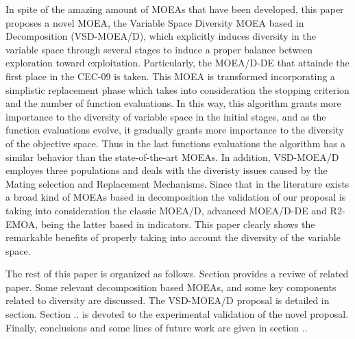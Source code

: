 In spite of the amazing amount of MOEAs that have been developed, this paper proposes a novel MOEA, the Variable Space Diversity MOEA based in Decomposition (VSD-MOEA/D), which explicitly induces diversity in the variable space through several stages to induce a proper balance between exploration toward exploitation.
%
Particularly, the MOEA/D-DE that attainde the first place in the CEC-09 is taken.
%
This MOEA is transformed incorporating a simplistic replacement phase which takes into consideration the stopping criterion and the number of function evaluations.
%
In this way, this algorithm grants more importance to the diversity of variable space in the initial stages, and as the function evaluations evolve, it gradually grants more importance to the diversity of the objective space.
%
Thus in the last functions evaluations the algorithm has a similar behavior than the state-of-the-art MOEAs.
%
In addition, VSD-MOEA/D employes three populations and deals with the diveristy issues caused by the Mating selection and Replacement Mechanisms.
%
Since that in the literature exists a broad kind of MOEAs based in decomposition the validation of our proposal is taking into consideration the classic MOEA/D, advanced MOEA/D-DE and R2-EMOA, being the latter based in indicators.
%
This paper clearly shows the remarkable benefits of properly taking into account the diversity of the variable space.

The rest of this paper is organized as follows.
%
Section provides a reviwe of related paper.
%
Some relevant decomposition based MOEAs, and some key components related to diversity are discussed.
%
The VSD-MOEA/D proposal is detailed in section.
%
Section .. is devoted to the experimental validation of the novel proposal.
%
Finally, conclusions and some lines of future work are given in section ..
%


